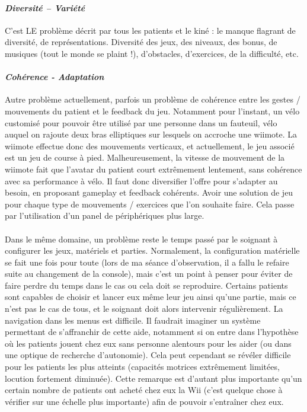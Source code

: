 		\paragraph{\emph{Diversité – Variété}\\}
C'est LE problème décrit par tous les patients et le kiné : le manque flagrant de diversité, de représentations. Diversité des jeux, des niveaux, des bonus, de musiques (tout le monde se plaint !), d'obstacles, d'exercices, de la difficulté, etc.

		\paragraph{\emph{Cohérence - Adaptation}\\}
Autre problème actuellement, parfois un problème de cohérence entre les gestes / mouvements du patient et le feedback du jeu. Notamment pour l'instant, un vélo customisé pour pouvoir être utilisé par une personne dans un fauteuil, vélo auquel on rajoute deux bras elliptiques sur lesquels on accroche une wiimote. La wiimote effectue donc des mouvements verticaux, et actuellement, le jeu associé est un jeu de course à pied. Malheureusement, la vitesse de mouvement de la wiimote fait que l'avatar du patient court extrêmement lentement, sans cohérence avec sa performance à vélo.
Il faut donc diversifier l'offre pour s'adapter au besoin, en proposant gameplay et feedback cohérents. Avoir une solution de jeu pour chaque type de mouvements / exercices que l'on souhaite faire. Cela passe par l'utilisation d'un panel de périphériques plus large.

\paragraph{}Dans le même domaine, un problème reste le temps passé par le soignant à configurer les jeux, matériels et parties. Normalement, la configuration matérielle se fait une fois pour toute (lors de ma séance d'observation, il a fallu le refaire suite au changement de la console), mais c'est un point à penser pour éviter de faire perdre du temps dans le cas ou cela doit se reproduire.
Certains patients sont capables de choisir et lancer eux même leur jeu ainsi qu'une partie, mais ce n'est pas le cas de tous, et le soignant doit alors intervenir régulièrement. La navigation dans les menus est difficile. Il faudrait imaginer un système permettant de s'affranchir de cette aide, notamment si on entre dans l'hypothèse où les patients jouent chez eux sans personne alentours pour les aider (ou dans une optique de recherche d'autonomie). Cela peut cependant se révéler difficile pour les patients les plus atteints (capacités motrices extrêmement limitées, locution fortement diminuée). Cette remarque est d'autant plus importante qu'un certain nombre de patients ont acheté chez eux la Wii (c'est quelque chose à vérifier sur une échelle plus importante) afin de pouvoir s'entraîner chez eux.

